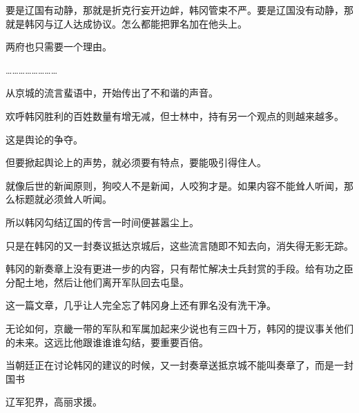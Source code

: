 要是辽国有动静，那就是折克行妄开边衅，韩冈管束不严。要是辽国没有动静，那就是韩冈与辽人达成协议。怎么都能把罪名加在他头上。

两府也只需要一个理由。

……………………

从京城的流言蜚语中，开始传出了不和谐的声音。

欢呼韩冈胜利的百姓数量有增无减，但士林中，持有另一个观点的则越来越多。

这是舆论的争夺。

但要掀起舆论上的声势，就必须要有特点，要能吸引得住人。

就像后世的新闻原则，狗咬人不是新闻，人咬狗才是。如果内容不能耸人听闻，那么标题就必须耸人听闻。

所以韩冈勾结辽国的传言一时间便甚嚣尘上。

只是在韩冈的又一封奏议抵达京城后，这些流言随即不知去向，消失得无影无踪。

韩冈的新奏章上没有更进一步的内容，只有帮忙解决士兵封赏的手段。给有功之臣分配土地，然后让他们离开军队回去屯垦。

这一篇文章，几乎让人完全忘了韩冈身上还有罪名没有洗干净。

无论如何，京畿一带的军队和军属加起来少说也有三四十万，韩冈的提议事关他们的未来。这远比他跟谁谁谁勾结，要重要百倍。

当朝廷正在讨论韩冈的建议的时候，又一封奏章送抵京城不能叫奏章了，而是一封国书

辽军犯界，高丽求援。

